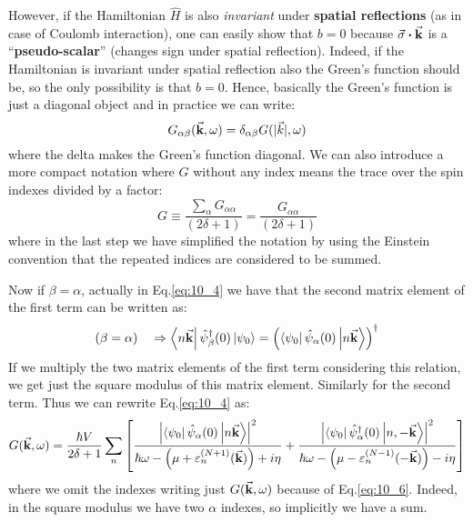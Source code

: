\documentclass[../main/main.tex]{subfiles}
\begin{document}
However, if the Hamiltonian \( \hat{H}  \) is also \emph{invariant} under \textbf{spatial reflections} 
 (as in case of Coulomb interaction), one can easily show that \( b=0 \) because \( \va{\sigma } \vdot \va{k} \) is a “\textbf{pseudo-scalar}” (changes sign under spatial reflection). Indeed, if the Hamiltonian is invariant under spatial reflection also the Green's function should be, so the only possibility is that \( b=0 \). Hence, basically the Green's function is just a diagonal object and in practice we can write:
\begin{equation}
  G_{\alpha \beta } (\va{k}, \omega ) = \delta _{\alpha \beta } G(| \vec{k} |, \omega   )
\end{equation}
where the delta makes the Green's function diagonal.
We can also introduce a more compact notation where \( G \) without any index means the trace over the spin indexes divided by a factor:
\begin{equation}
  G \equiv  \frac{\sum_{\alpha }^{} G_{\alpha \alpha }  }{(2 \delta +1)}
  = \frac{G_{\alpha \alpha }}{(2 \delta +1)}
  \label{eq:10_6}
\end{equation}
where in the last step we have simplified the notation by using the Einstein convention that the repeated indices are considered to be summed.


Now if \( \beta = \alpha  \), actually in Eq.\eqref{eq:10_4} we have that the second matrix element of the first term can be written as:
\begin{equation*}
  (\beta =\alpha ) \quad \Rightarrow \bra{n \va{k}} \hat{\psi }_ \beta ^\dag (0) \ket{\psi _0}
  = \qty( \bra{\psi _0} \hat{\psi }_ \alpha (0) \ket{n \va{k}}   )^\dag
\end{equation*}
If we multiply the two matrix elements of the first term considering this relation, we get just the square modulus of this matrix element. Similarly for the second term. Thus we can rewrite Eq.\eqref{eq:10_4} as:
\begin{equation}
  G (\va{k}, \omega )
  =  \frac{\hbar V}{2 \delta +1} \sum_{n}^{}
  \qty[
  \frac{ \abs{\bra{\psi _0} \hat{\psi }_ \alpha
   (0) \ket{ n \va{k}}}^2 }
   { \hbar \omega - \qty( \mu + \varepsilon _n^{(N+1)}(\va{k})) + i \eta }
   +
  \frac{\abs{\bra{\psi _0} \hat{\psi }_ \alpha  ^\dag (0) \ket{n, -\va{k}}}^2  }
  {  \hbar \omega - \qty( \mu - \varepsilon _n^{(N-1)} (-\va{k})) - i \eta } ]
  \label{eq:10_5}
\end{equation}
where we omit the indexes writing just \( G(\va{k},\omega ) \) because of Eq.\eqref{eq:10_6}. Indeed, in the square modulus we have two \( \alpha  \) indexes, so implicitly we have a sum.
\end{document}
